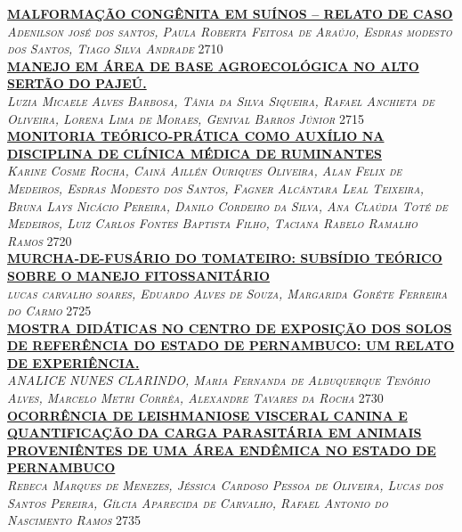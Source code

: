 \noindent \textsc{\hyperlink{trabalhos/249936.pdf.1}{\textbf{MALFORMAÇÃO CONGÊNITA EM SUÍNOS – RELATO DE CASO}}}\\ 
\noindent \textsc{\textit{Adenilson josé dos santos, Paula Roberta Feitosa  de Araújo, Esdras modesto dos Santos, Tiago Silva Andrade}} \hfill 2710\\ 

\noindent \textsc{\hyperlink{trabalhos/250404.pdf.1}{\textbf{MANEJO EM ÁREA DE BASE AGROECOLÓGICA NO ALTO SERTÃO DO PAJEÚ.}}}\\ 
\noindent \textsc{\textit{Luzia Micaele Alves Barbosa, Tânia da Silva Siqueira, Rafael Anchieta de Oliveira, Lorena Lima de Moraes, Genival Barros Júnior}} \hfill 2715\\ 

\noindent \textsc{\hyperlink{trabalhos/251781.pdf.1}{\textbf{MONITORIA TEÓRICO-PRÁTICA COMO AUXÍLIO NA DISCIPLINA DE CLÍNICA MÉDICA DE RUMINANTES}}}\\ 
\noindent \textsc{\textit{Karine Cosme Rocha, Cainã Aillén Ouriques Oliveira, Alan Felix de Medeiros, Esdras Modesto dos Santos, Fagner Alcântara Leal Teixeira, Bruna Lays Nicácio Pereira, Danilo Cordeiro da Silva, Ana Claúdia Toté de Medeiros, Luiz Carlos Fontes Baptista Filho, Taciana Rabelo Ramalho Ramos}} \hfill 2720\\ 

\noindent \textsc{\hyperlink{trabalhos/251466.pdf.1}{\textbf{MURCHA-DE-FUSÁRIO DO TOMATEIRO: SUBSÍDIO TEÓRICO SOBRE O MANEJO FITOSSANITÁRIO }}}\\ 
\noindent \textsc{\textit{lucas carvalho soares, Eduardo Alves de Souza, Margarida Goréte Ferreira do Carmo}} \hfill 2725\\ 

\noindent \textsc{\hyperlink{trabalhos/251845.pdf.1}{\textbf{MOSTRA DIDÁTICAS NO CENTRO DE EXPOSIÇÃO DOS SOLOS DE REFERÊNCIA DO ESTADO DE PERNAMBUCO: UM RELATO DE EXPERIÊNCIA.}}}\\ 
\noindent \textsc{\textit{ANALICE NUNES CLARINDO, Maria Fernanda de Albuquerque Tenório Alves, Marcelo Metri Corrêa, Alexandre Tavares da Rocha}} \hfill 2730\\ 

\noindent \textsc{\hyperlink{trabalhos/249752.pdf.1}{\textbf{OCORRÊNCIA DE LEISHMANIOSE VISCERAL CANINA E QUANTIFICAÇÃO DA CARGA PARASITÁRIA EM ANIMAIS PROVENIÊNTES DE UMA ÁREA ENDÊMICA NO ESTADO DE PERNAMBUCO}}}\\ 
\noindent \textsc{\textit{Rebeca Marques de Menezes, Jéssica Cardoso Pessoa de Oliveira, Lucas dos Santos Pereira, Gílcia Aparecida de Carvalho, Rafael Antonio do Nascimento Ramos}} \hfill 2735\\ 

